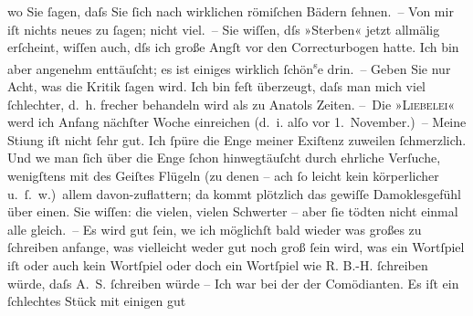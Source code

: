 \begin{ledgroupsized}[t]{13cm}
               wo Sie ſagen, daſs Sie ſich nach wirklichen römiſchen Bädern ſehnen. –\pend
           \pstart
           Von mir iſt nichts neues zu ſagen; nicht viel. – Sie wiſſen, dſs »Sterben« jetzt allmälig erſcheint, wiſſen auch, dſs ich große
               Angſt vor den Correctur{\pb}bogen hatte. Ich bin aber
               angenehm enttäuſcht; es ist einiges wirklich ſchön\substVorne{}\textsuperscript{s}\substDazwischen{}e\substHinten{} drin. – Geben Sie nur Acht, was die Kritik ſagen wird. Ich bin feſt
               überzeugt, daſs man mich viel ſchlechter, d. h. frecher behandeln wird als zu Anatols Zeiten.\pend
           \pstart
           – Die »\textsc{Liebelei}« werd ich Anfang nächſter Woche einreichen (d. i. alſo vor
                  1. November.) –\pend
           \pstart
           Meine Sti{\geminationm}ung iſt nicht ſehr gut. Ich ſpüre die Enge
               meiner Exiſtenz zuweilen ſchmerzlich. Und we{\geminationn} man ſich
               über die Enge ſchon hinwegtäuſcht durch ehrliche Verſuche, wenigſtens mit des Geiſtes
               Flügeln (zu denen – ach ſo leicht kein körperlicher u. ſ. w.) allem davon-zu{\pb}flattern; da kommt plötzlich das gewiſſe
               Damoklesgefühl über einen. Sie wiſſen: die vielen, vielen Schwerter – aber ſie tödten
               nicht einmal alle gleich. –\pend
           \pstart
           Es wird gut ſein, we{\geminationn} ich möglichſt bald wieder was
               großes zu ſchreiben anfange, was vielleicht weder gut noch groß ſein wird, was ein
               Wortſpiel iſt oder auch kein Wortſpiel oder doch ein Wortſpiel wie \textsc{R. B.-H.}{ }ſchreiben würde, daſs A. S. ſchreiben würde –\pend
           \pstart
           Ich war bei der \label{K_L00392_1v}\label{K_L00392_1h} der Comödianten. Es iſt ein ſchlechtes Stück mit einigen gut

\end{ledgroupsized}
